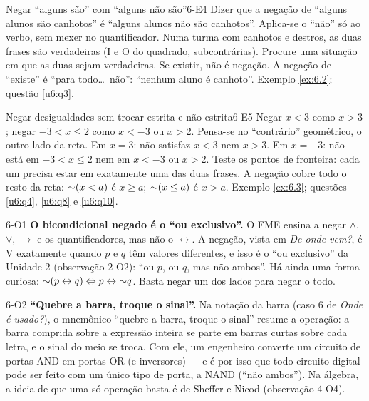 \begin{erro}{Negar \enquote{alguns são} com \enquote{alguns não são}}{6-E4}
 Dizer que a negação de \enquote{alguns alunos são canhotos} é \enquote{alguns alunos não são canhotos}.
 Aplica-se o \enquote{não} só ao verbo, sem mexer no quantificador.
 Numa turma com canhotos e destros, as duas frases são verdadeiras (I e O do quadrado, subcontrárias).
 Procure uma situação em que as duas sejam verdadeiras. Se existir, não é negação.
 A negação de \enquote{existe} é \enquote{para todo\ldots\ não}: \enquote{nenhum aluno é canhoto}.
 Exemplo \ref{ex:6.2}; questão \ref{u6:q3}.
\end{erro}

\begin{erro}{Negar desigualdades sem trocar estrita e não estrita}{6-E5}
 Negar $x<3$ como $x>3$; negar $-3<x\le2$ como $x<-3$ ou $x>2$.
 Pensa-se no \enquote{contrário} geométrico, o outro lado da reta.
 Em $x=3$: não satisfaz $x<3$ nem $x>3$. Em $x=-3$: não está em $-3<x\le2$ nem em $x<-3$ ou $x>2$.
 Teste os pontos de fronteira: cada um precisa estar em exatamente uma das duas frases.
 A negação cobre todo o resto da reta: ${{\sim}}(x<a)$ é $x\ge a$; ${{\sim}}(x\le a)$ é $x>a$.
 Exemplo \ref{ex:6.3}; questões \ref{u6:q4}, \ref{u6:q8} e \ref{u6:q10}.
\end{erro}

\Observacoes

\begin{obs}{6-O1}
\textbf{O bicondicional negado é o \enquote{ou exclusivo}.} O FME ensina a negar $\wedge$, $\vee$, $\rightarrow$ e os quantificadores, mas não o $\leftrightarrow$. A negação, vista em \emph{De onde vem?}, é V exatamente quando $p$ e $q$ têm valores diferentes, e isso é o \enquote{ou exclusivo} da Unidade 2 (observação 2-O2): \enquote{ou $p$, ou $q$, mas não ambos}. Há ainda uma forma curiosa: ${{\sim}}(p\leftrightarrow q)\Leftrightarrow p\leftrightarrow{{\sim}}q$. Basta negar um dos lados para negar o todo.
\end{obs}

\begin{obs}{6-O2}
\textbf{\enquote{Quebre a barra, troque o sinal}.} Na notação da barra (caso 6 de \emph{Onde é usado?}), o mnemônico \enquote{quebre a barra, troque o sinal} resume a operação: a barra comprida sobre a expressão inteira se parte em barras curtas sobre cada letra, e o sinal do meio se troca. Com ele, um engenheiro converte um circuito de portas AND em portas OR (e inversores) — e é por isso que todo circuito digital pode ser feito com um único tipo de porta, a NAND (\enquote{não ambos}). Na álgebra, a ideia de que uma só operação basta é de Sheffer e Nicod (observação 4-O4).
\end{obs}

